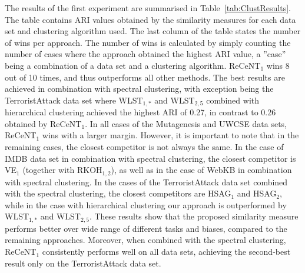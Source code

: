 The results of the first experiment are summarised in Table~\ref{tab:ClustResults}.
The table contains ARI values obtained by the similarity measures for each data set and clustering algorithm used.
The last column of the table states the number of wins per approach.
The number of wins is calculated by simply counting the number of cases where the approach obtained the highest ARI value, a ''case'' being a combination of a data set and a clustering algorithm.
ReCeNT$_1$ wins 8 out of 10 times, and thus outperforms all other methods.
The best results are achieved in combination with spectral clustering, with exception being the TerroristAttack data set where WLST$_{1,*}$ and WLST$_{2,5}$ combined with hierarchical clustering achieved the highest ARI of 0.27, in contrast to 0.26 obtained by ReCeNT$_1$.
In all cases of the Mutagenesis and UWCSE data sets, ReCeNT$_1$ wins with a larger margin.
However, it is important to note that in the remaining cases, the closest competitor is not always the same.
In the case of IMDB data set in combination with spectral clustering, the closest competitor is VE$_1$ (together with RKOH$_{1,2}$), as well as in the case of WebKB in combination with spectral clustering.
In the cases of the TerroristAttack data set combined with the spectral clustering, the closest competitors are HSAG$_1$ and HSAG$_2$, while in the case with hierarchical clustering our approach is outperformed by WLST$_{1,*}$ and WLST$_{2,5}$.
These results show that the proposed similarity measure performs better over wide range of different tasks and biases, compared to the remaining approaches.
Moreover, when combined with the spectral clustering, ReCeNT$_1$ consistently performs well on all data sets, achieving the second-best result only on the TerroristAttack data set.



